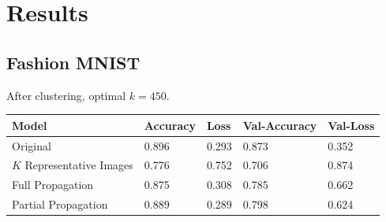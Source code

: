 \documentclass[10pt]{article}
\begin{document}
\newpage
\section{Results}
\subsection{Fashion MNIST}
  After clustering, optimal $k = 450$.
    \begin{table}[h]
        \begin{center}
            \begin{tabular}{|l|l|l|l|l|}
                \hline
                Model &Accuracy &Loss &Val-Accuracy &Val-Loss \\
                \hline
                Original &0.896 &0.293 &0.873 &0.352 \\
                $K$ Representative Images &0.776 &0.752 & 0.706 &0.874 \\
                Full Propagation &0.875 &0.308 &0.785 &0.662 \\
                Partial Propagation  &0.889 &0.289 &0.798 &0.624 \\
                \hline
            \end{tabular}
        \end{center}
    \end{table}
\end{document}
